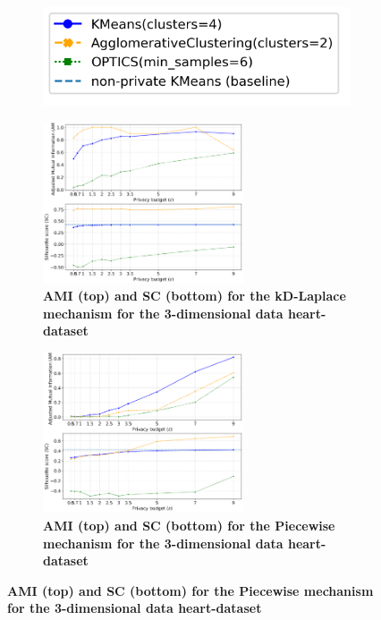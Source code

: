 \begin{figure}[H]
  \centering
  \begin{subfigure}{0.3\textwidth}
    \includegraphics[width=\textwidth]{Results/kd-laplace/kd-Laplace/heart-dataset/legend_3.png}
  \end{subfigure}
  \begin{subfigure}{1\textwidth}
    \caption{\textbf{AMI (top) and SC (bottom) for the kD-Laplace mechanism for the 3-dimensional data heart-dataset}}
    \centering
    \includegraphics[width=0.65\textwidth]{Results/kd-laplace/kd-Laplace/heart-dataset/ami-and-sc_3_dimensions.png}
    \centering
  \end{subfigure}
  \begin{subfigure}{1\textwidth}
    \caption{\textbf{AMI (top) and SC (bottom) for the Piecewise mechanism for the 3-dimensional data heart-dataset}}
    \centering
    \includegraphics[width=0.65\textwidth]{Results/kd-laplace/piecewise/heart-dataset/ami-and-sc_3_dimensions.png}
  \end{subfigure}
  \label{fig:validation-heart-dataset_comparison_3d-laplace}
\end{figure}
